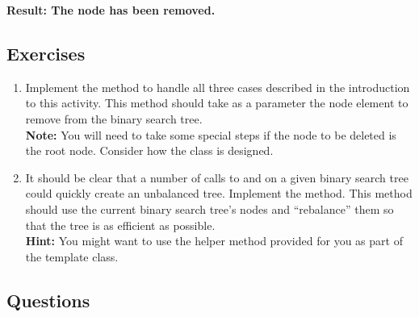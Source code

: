 				\begin{minipage}{0.33\textwidth}
					\begin{center}
						\textbf{\footnotesize Result: The node has been removed.}\\[4.5pt]
					\end{center}
				\end{minipage}

		\pagebreak

		\subsection{Exercises}
			\begin{enumerate}
				\item Implement the  method to handle all three cases described in the introduction to this activity. This method should take as a parameter the node element to remove from the binary search tree.\\
				{\small\textbf{Note:} You will need to take some special steps if the node to be deleted is the root node. Consider how the  class is designed.}
				\item It should be clear that a number of calls to  and  on a given binary search tree could quickly create an unbalanced tree. Implement the  method. This method should use the current binary search tree's nodes and ``rebalance'' them so that the tree is as efficient as possible.\\
				{\small\textbf{Hint:} You might want to use the  helper method provided for you as part of the  template class.}
			\end{enumerate}
		\subsection{Questions}
			\ \\[9pt]
	\pagebreak

